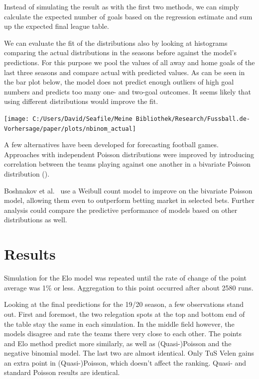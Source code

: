 \documentclass[12pt,a4paper]{article}
\let\origfigure\figure
\let\endorigfigure\endfigure
\renewenvironment{figure}[1][2] {
    \expandafter\origfigure\expandafter[H]
} {
    \endorigfigure
}
\begin{document}
Instead of simulating the result as with the first two methods, we can
simply calculate the expected number of goals based on the regression
estimate and sum up the expected final league table.

We can evaluate the fit of the distributions also by looking at
histograms comparing the actual distributions in the seasons before
against the model's predictions. For this purpose we pool the values of
all away and home goals of the last three seasons and compare actual
with predicted values. As can be seen in the bar plot below, the model
does not predict enough outliers of high goal numbers and predicts too
many one- and two-goal outcomes. It seems likely that using different
distributions would improve the fit.

\begin{figure}

{\centering \texttt{[image: C:/Users/David/Seafile/Meine Bibliothek/Research/Fussball.de-Vorhersage/paper/plots/nbinom\_actual]} 

}

\caption{Comparison of actual distribution of goals in all preceding seasons with the prediction from a negative binomial regression}\label{fig:unnamed-chunk-3}
\end{figure}

A few alternatives have been developed for forecasting football games.
Approaches with independent Poisson distributions were improved by
introducing correlation between the teams playing against one another in
a bivariate Poisson distribution (\textcite{karlis2003}).

Boshnakov et al.~\autocite*{boshnakov2016} use a Weibull count model to
improve on the bivariate Poisson model, allowing them even to outperform
betting market in selected bets. Further analysis could compare the
predictive performance of models based on other distributions as well.

\hypertarget{results}{%
\section{Results}\label{results}}

Simulation for the Elo model was repeated until the rate of change of
the point average was 1\% or less. Aggregation to this point occurred
after about 2580 runs.

Looking at the final predictions for the 19/20 season, a few
observations stand out. First and foremost, the two relegation spots at
the top and bottom end of the table stay the same in each simulation. In
the middle field however, the models disagree and rate the teams there
very close to each other. The points and Elo method predict more
similarly, as well as (Quasi-)Poisson and the negative binomial model.
The last two are almost identical. Only TuS Velen gains an extra point
in (Quasi-)Poisson, which doesn't affect the ranking. Quasi- and
standard Poisson results are identical.
\end{document}
